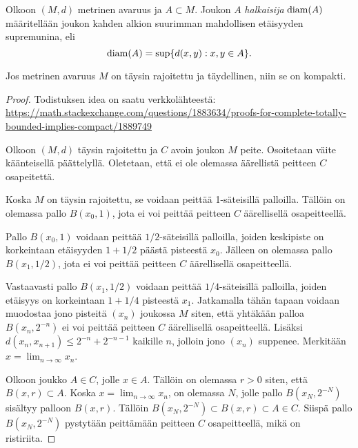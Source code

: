 \documentclass[12pt,oneside,a4paper]{amsbook} %
\begin{document}
\begin{definition}
    Olkoon $(M, d)$ metrinen avaruus ja $A \subset M$. Joukon $A$ \textit{halkaisija} $\operatorname{diam}(A)$ määritellään joukon kahden alkion suurimman mahdollisen etäisyyden supremunina, eli
    \begin{equation*}
        \operatorname{diam}(A) = \sup\{d(x, y) : x,y \in A\}.
    \end{equation*}
\end{definition}

\begin{theorem}\label{thm:compactness}
    Jos metrinen avaruus $M$ on täysin rajoitettu ja täydellinen, niin se on kompakti.
\end{theorem}
\begin{proof}
Todistuksen idea on saatu verkkolähteestä:  \url{https://math.stackexchange.com/questions/1883634/proofs-for-complete-totally-bounded-implies-compact/1889749}

Olkoon $(M, d)$ täysin rajoitettu ja $C$ avoin joukon $M$ peite. Osoitetaan väite käänteisellä päättelyllä. Oletetaan, että ei ole olemassa äärellistä peitteen $C$ osapeitettä.

Koska $M$ on täysin rajoitettu, se voidaan peittää 1-säteisillä palloilla. Tällöin on olemassa pallo $B(x_0,1)$, jota ei voi peittää peitteen $C$ äärellisellä osapeitteellä.

Pallo $B(x_0,1)$ voidaan peittää $1/2$-säteisillä palloilla, joiden keskipiste on korkeintaan etäisyyden $1 + 1/2$ päästä pisteestä $x_0$. Jälleen on olemassa pallo $B(x_1, 1/2)$, jota ei voi peittää peitteen $C$ äärellisellä osapeitteellä.

Vastaavasti pallo $B(x_1, 1/2)$ voidaan peittää $1/4$-säteisillä palloilla, joiden etäisyys on korkeintaan $1+1/4$ pisteestä $x_1$. Jatkamalla tähän tapaan voidaan muodostaa jono pisteitä $(x_n)$ joukossa $M$ siten, että yhtäkään palloa $B(x_n, 2^{-n})$ ei voi peittää peitteen $C$ äärellisellä osapeitteellä. Lisäksi $d(x_n, x_{n+1})  \le 2^{-n} + 2^{-n-1}$ kaikille $n$, jolloin jono $(x_n)$ suppenee. Merkitään $x = \lim_{n\to\infty} x_n$.

Olkoon joukko $A \in C$, jolle $x \in A$. Tällöin on olemassa $r > 0$ siten, että $B(x,r) \subset A$. Koska $x = \lim_{n\to\infty} x_n$, on olemassa $N$, jolle pallo $B(x_N, 2^{-N})$ sisältyy palloon $B(x, r)$. Tällöin $B(x_N, 2^{-N}) \subset B(x, r) \subset A \in C$. Siispä pallo $B(x_N, 2^{-N})$ pystytään peittämään peitteen $C$ osapeitteellä, mikä on ristiriita.
\end{proof}
\end{document}
